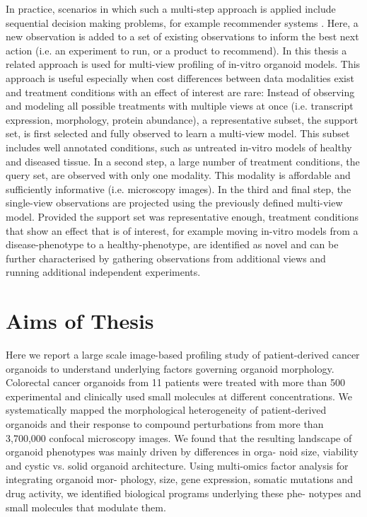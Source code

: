 \begin{flushleft}
In practice, scenarios in which such a multi-step approach is applied include sequential decision making problems, for example recommender systems \citep{korenMatrixFactorizationTechniques2009}. Here, a new observation is added to a set of existing observations to inform the best next action (i.e. an experiment to run, or a product to recommend). In this thesis a related approach is used for multi-view profiling of in-vitro organoid models. This approach is useful especially when cost differences between data modalities exist and treatment conditions with an effect of interest are rare: Instead of observing and modeling all possible treatments with multiple views at once (i.e. transcript expression, morphology, protein abundance), a representative subset, the support set, is first selected and fully observed to learn a multi-view model. This subset includes well annotated conditions, such as untreated in-vitro models of healthy and diseased tissue. In a second step, a large number of treatment conditions, the query set, are observed with only one modality. This modality is affordable and sufficiently informative (i.e. microscopy images). In the third and final step, the single-view observations are projected using the previously defined multi-view model. Provided the support set was representative enough, treatment conditions that show an effect that is of interest, for example moving in-vitro models from a disease-phenotype to a healthy-phenotype, are identified as novel and can be further characterised by gathering observations from additional views and running additional independent experiments.

\section{Aims of Thesis}
Here we report a large scale image-based profiling study of patient-derived cancer organoids to understand underlying factors governing organoid morphology. Colorectal cancer organoids from 11 patients were treated with more than 500 experimental and clinically used small molecules at different concentrations. We systematically mapped the morphological heterogeneity of patient-derived organoids and their response to compound perturbations from more than 3,700,000 confocal microscopy images. We found that the resulting landscape of organoid phenotypes was mainly driven by differences in orga- noid size, viability and cystic vs. solid organoid architecture. Using multi-omics factor analysis for integrating organoid mor- phology, size, gene expression, somatic mutations and drug activity, we identified biological programs underlying these phe- notypes and small molecules that modulate them.


\end{flushleft}
